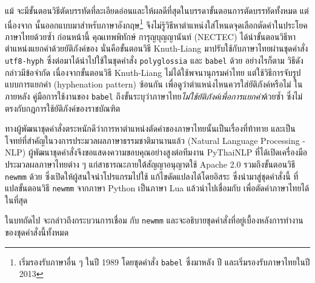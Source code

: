 แม้ \texlogo
จะมีขั้นตอนวิธีตัดบรรทัดที่ละเอียดอ่อนและให้ผลดีที่สุดในบรรดาขั้นตอนการตัดบรรทัดทั้งหมด
แต่เนื่องจาก \texlogo นั้นออกแบบมาสำหรับภาษาอังกฤษ\footnote{\texlogo
เริ่มรองรับภาษาอื่น ๆ ในปี 1989 โดยชุดคำสั่ง \texttt{babel} ซึ่งมาหลัง  ปี และเริ่มรองรับภาษาไทยในปี 2013} \texlogo
จึงไม่รู้วิธีหาตำแหน่งใส่โหนดจุดเลือกตัดคำในประโยคภาษาไทยด้วยซ้ำ ก่อนหน้านี้
คุณเทพพิทักษ์ การุญบุญญานันท์ (NECTEC)
ได้นำขั้นตอนวิธีหาตำแหน่งแยกคำด้วยยัติภังค์ของ \texlogo นั่นคือขั้นตอนวิธี
Knuth-Liang \parencite{knuth-liang} มาปรับใช้กับภาษาไทยผ่านชุดคำสั่ง
\texttt{utf8-hyph} \parencite{hyphenation-org} ซึ่งต่อมาได้นำไปใช้ในชุดคำสั่ง
\texttt{polyglossia} และ \texttt{babel} ด้วย อย่างไรก็ตาม วิธีดังกล่าวมีข้อจำกัด
เนื่องจากขั้นตอนวิธี Knuth-Liang ไม่ได้ใช้พจนานุกรมคำไทย
แต่ใช้วิธีการจับรูปแบบการแยกคำ (hyphenation pattern) ซ้อนกัน
เพื่อดูว่าตำแหน่งไหนควรใส่ยัติภังค์หรือไม่ ในภายหลัง คู่มือการใช้งานของ
\texttt{babel}
ถึงขั้นระบุว่าภาษาไทย\emph{ไม่ใช้ยัติภังค์เพื่อการแยกคำ}ด้วยซ้ำ
\parencite{babel-thai-page} ซึ่งไม่ตรงกับกฎการใช้ยัติภังค์ของราชบัณฑิต

ทางผู้พัฒนาชุดคำสั่งตระหนักดีว่าการหาตำแหน่งตัดคำของภาษาไทยนั้นเป็นเรื่องที่ท้าทาย
และเป็นโจทย์ที่สำคัญในวงการประมวลผลภาษาธรรมชาติมานานแล้ว (Natural Language
Processing - NLP) ผู้พัฒนาชุดคำสั่งจึงขอแสดงความขอบคุณอย่างสูงต่อทีมงาน
PyThaiNLP ที่ได้เปิดเครื่องมือประมวลผลภาษาไทยต่าง ๆ
แก่สาธารณะภายใต้สัญญาอนุญาตใช้ Apache 2.0 รวมถึงขั้นตอนวิธี \texttt{newmm} ด้วย
ซึ่งเปิดให้ผู้สนใจนำโปรแกรมไปใช้ แก้ไขดัดแปลงได้โดยอิสระ ซึ่งนำมาสู่ชุดคำสั่งนี้
ที่แปลขั้นตอนวิธี \texttt{newmm} จากภาษา Python เป็นภาษา Lua แล้วนำไปเชื่อมกับ
\lualatexlogo เพื่อตัดคำภาษาไทยได้ในที่สุด

ในบทถัดไป จะกล่าวถึงกระบวนการเชื่อม \lualatexlogo กับ \texttt{newmm}
และจะอธิบายชุดคำสั่งที่อยู่เบื้องหลังการทำงานของชุดคำสั่งนี้ทั้งหมด
